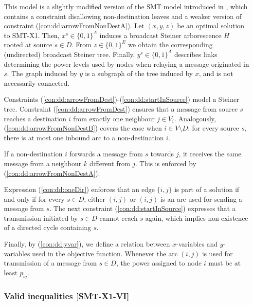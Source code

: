 This model is a slightly modified version of the SMT model introduced in \cite{ivanova16isco}, which contains a constraint disallowing non-destination leaves and a weaker version of constraint (\ref{con:dd:arrowFromNonDestA}).  
Let $(x,y,z)$ be an optimal solution to SMT-X1. Then, $x^s\in \{0,1\}^{A}$ induces a broadcast Steiner arborescence $H$ rooted at source $s\in D$. From $z\in \{0,1\}^E$ we obtain the corresponding (undirected) broadcast Steiner tree. Finally, $y^s\in \{0,1\}^{A}$ describes links determining the power levels used by nodes when relaying a message originated in $s$. The graph induced by $y$ is  a subgraph of the tree induced by $x$, and is not necessarily connected.

Constraints (\ref{con:dd:arrowFromDest})-(\ref{con:dd:startInSource}) model a Steiner tree. Constraint (\ref{con:dd:arrowFromDest}) ensures that a message from source $s$ reaches a destination $i$ from exactly one neighbour $j\in V_i$. Analogously, (\ref{con:dd:arrowFromNonDestB}) covers the case when $i \in V\setminus D$: for every source $s$, there is at most one inbound arc to a non-destination $i$. 

If a non-destination $i$ forwards a message from $s$ towards $j$, it receives the same message from a neighbour $k$ different from $j$. This is enforced by (\ref{con:dd:arrowFromNonDestA}). 

Expression (\ref{con:dd:oneDir}) enforces that an edge $\{i,j\}$ is part of a solution if and only if for every $s\in D$, either $(i,j)$ or $(i,j)$ is an arc used for sending a message from $s$. The next constraint (\ref{con:dd:startInSource}) expresses that a transmission initiated by $s\in D$ cannot reach $s$ again, which implies non-existence of a directed cycle containing $s$. 

Finally, by (\ref{con:dd:yvar}), we define a relation between $x$-variables and $y$-variables used in the objective function. Whenever the arc $(i,j)$ is used for transmission of a message from $s\in D$, the power assigned to node $i$ must be at least $p_{ij}$.
\subsubsection{Valid inequalities [SMT-X1-VI]}

